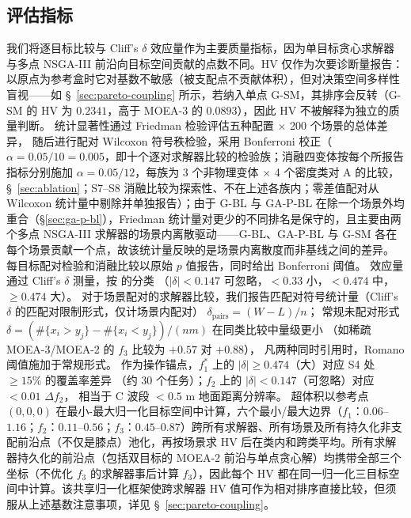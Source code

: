 \documentclass[preprint,12pt,authoryear]{elsarticle}
\begin{document}
\subsection{评估指标}\label{sec:evaluation-metrics}
我们将逐目标比较与 Cliff's $\delta$ 效应量作为主要质量指标，因为单目标贪心求解器与多点 NSGA-III 前沿向目标空间贡献的点数不同。HV 仅作为次要诊断量报告：以原点为参考盒时它对基数不敏感（被支配点不贡献体积），但对决策空间多样性盲视——如 \S~\ref{sec:pareto-coupling} 所示，若纳入单点 G-SM，其排序会反转（G-SM 的 HV 为 $0.2341$，高于 MOEA-3 的 $0.0893$），因此 HV 不被解释为独立的质量判断。
统计显著性通过 Friedman 检验评估五种配置 $\times$ 200 个场景的总体差异，
随后进行配对 Wilcoxon 符号秩检验，采用 Bonferroni 校正（$\alpha = 0.05 / 10 = 0.005$，即十个逐对求解器比较的检验族；消融四变体按每个所报告指标分别施加 $\alpha=0.05/12$，每族为 3 个非物理变体 $\times$ 4 个密度类对 A 的比较，\S~\ref{sec:ablation}；S7--S8 消融比较为探索性、不在上述各族内；零差值配对从 Wilcoxon 统计量中剔除并单独报告）；由于 G-BL 与 GA-P-BL 在除一个场景外均重合（\S\ref{sec:ga-p-bl}），Friedman 统计量对更少的不同排名是保守的，且主要由两个多点 NSGA-III 求解器的场景内离散驱动——G-BL、GA-P-BL 与 G-SM 各在每个场景贡献一个点，故该统计量反映的是场景内离散度而非基线之间的差异。
每目标配对检验和消融比较以原始 $p$ 值报告，同时给出 Bonferroni 阈值。
效应量通过 Cliff's $\delta$ 测量，按 \citet{Romano2006} 的分类
（$|\delta| < 0.147$ 可忽略，$< 0.33$ 小，$< 0.474$ 中，$\geq 0.474$ 大）。
对于场景配对的求解器比较，我们报告匹配对符号统计量（Cliff's $\delta$ 的匹配对限制形式，仅计场景内配对）
$\delta_{\text{pairs}} = (W - L)/n$；
常规未配对形式 $\delta = (\#\{x_i>y_j\}-\#\{x_i<y_j\})/(nm)$ 在同类比较中量级更小
（如稀疏 MOEA-3/MOEA-2 的 $f_3$ 比较为 $+0.57$ 对 $+0.88$），
凡两种同时引用时，Romano 阈值施加于常规形式。
作为操作锚点，$f_1^*$ 上的 $|\delta| \geq 0.474$（大）对应 S4 处 $\geq 15\%$ 的覆盖率差异
（约 30 个任务）；$f_2$ 上的 $|\delta| < 0.147$（可忽略）对应 $< 0.01$ $\Delta f_2$，
相当于 C 波段 $< 0.5$ m 地面距离分辨率。
超体积以参考点 $(0, 0, 0)$ 在最小-最大归一化目标空间中计算，六个最小/最大边界（$f_1$：$0.06$--$1.16$；$f_2$：$0.11$--$0.56$；$f_3$：$0.45$--$0.87$）跨所有求解器、所有场景及所有持久化非支配前沿点（不仅是膝点）池化，再按场景求 HV 后在类内和跨类平均。所有求解器持久化的前沿点（包括双目标的 MOEA-2 前沿与单点贪心解）均携带全部三个坐标（不优化 $f_3$ 的求解器事后计算 $f_3$），因此每个 HV 都在同一归一化三目标空间中计算。该共享归一化框架使跨求解器 HV 值可作为相对排序直接比较，但须服从上述基数注意事项，详见 \S~\ref{sec:pareto-coupling}。
\end{document}
